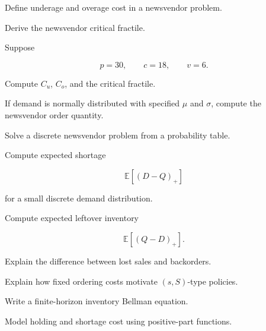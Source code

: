 \begin{exercise}[2]
Define underage and overage cost in a newsvendor problem.
\end{exercise}

\begin{exercise}[3]
Derive the newsvendor critical fractile.
\end{exercise}

\begin{exercise}[3]
Suppose

\[
p=30,
\qquad
c=18,
\qquad
v=6.
\]

Compute \(C_u\), \(C_o\), and the critical fractile.
\end{exercise}

\begin{exercise}[3]
If demand is normally distributed with specified \(\mu\) and \(\sigma\),
compute the newsvendor order quantity.
\end{exercise}

\begin{exercise}[3]
Solve a discrete newsvendor problem from a probability table.
\end{exercise}

\begin{exercise}[3]
Compute expected shortage

\[
\mathbb{E}[(D-Q)_+]
\]

for a small discrete demand distribution.
\end{exercise}

\begin{exercise}[3]
Compute expected leftover inventory

\[
\mathbb{E}[(Q-D)_+].
\]
\end{exercise}

\begin{exercise}[3]
Explain the difference between lost sales and backorders.
\end{exercise}

\begin{exercise}[3]
Explain how fixed ordering costs motivate \((s,S)\)-type policies.
\end{exercise}

\begin{exercise}[3]
Write a finite-horizon inventory Bellman equation.
\end{exercise}

\begin{exercise}[3]
Model holding and shortage cost using positive-part functions.
\end{exercise}

